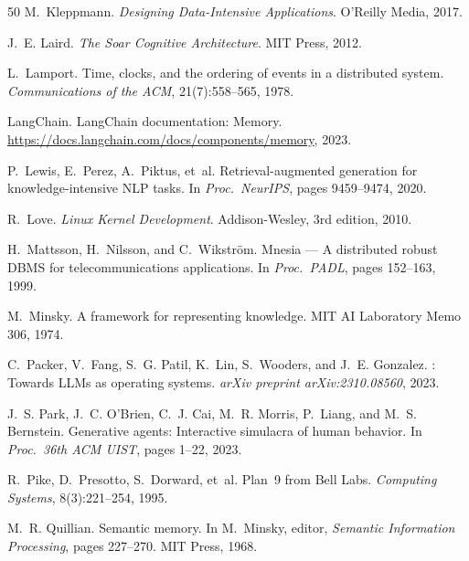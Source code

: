 \documentclass[12pt,a4paper]{article}
\theoremstyle{definition}
\begin{document}
\begin{thebibliography}{50}
M.~Kleppmann.
\newblock \emph{Designing Data-Intensive Applications}.
\newblock O'Reilly Media, 2017.

J.~E. Laird.
\newblock \emph{The Soar Cognitive Architecture}.
\newblock MIT Press, 2012.

L.~Lamport.
\newblock Time, clocks, and the ordering of events in a distributed system.
\newblock \emph{Communications of the ACM}, 21(7):558--565, 1978.

LangChain.
\newblock LangChain documentation: Memory.
\newblock \url{https://docs.langchain.com/docs/components/memory}, 2023.

P.~Lewis, E.~Perez, A.~Piktus, et~al.
\newblock Retrieval-augmented generation for knowledge-intensive {NLP} tasks.
\newblock In \emph{Proc.\ NeurIPS}, pages 9459--9474, 2020.

R.~Love.
\newblock \emph{Linux Kernel Development}.
\newblock Addison-Wesley, 3rd edition, 2010.

H.~Mattsson, H.~Nilsson, and C.~Wikstr\"om.
\newblock Mnesia --- A distributed robust {DBMS} for telecommunications applications.
\newblock In \emph{Proc.\ PADL}, pages 152--163, 1999.

M.~Minsky.
\newblock A framework for representing knowledge.
\newblock MIT AI Laboratory Memo 306, 1974.

C.~Packer, V.~Fang, S.~G. Patil, K.~Lin, S.~Wooders, and J.~E. Gonzalez.
: Towards {LLM}s as operating systems.
\newblock \emph{arXiv preprint arXiv:2310.08560}, 2023.

J.~S. Park, J.~C. O'Brien, C.~J. Cai, M.~R. Morris, P.~Liang, and M.~S. Bernstein.
\newblock Generative agents: Interactive simulacra of human behavior.
\newblock In \emph{Proc.\ 36th ACM UIST}, pages 1--22, 2023.

R.~Pike, D.~Presotto, S.~Dorward, et~al.
\newblock Plan~9 from {Bell Labs}.
\newblock \emph{Computing Systems}, 8(3):221--254, 1995.

M.~R. Quillian.
\newblock Semantic memory.
\newblock In M.~Minsky, editor, \emph{Semantic Information Processing}, pages 227--270. MIT Press, 1968.


\end{thebibliography}
\end{document}
